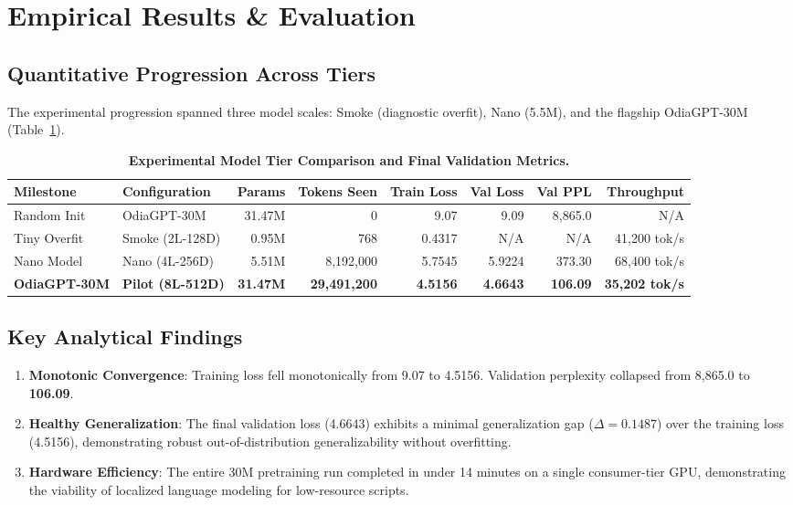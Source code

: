 \documentclass[10pt,twocolumn,letterpaper]{article}
\begin{document}
\section{Empirical Results \& Evaluation}

\subsection{Quantitative Progression Across Tiers}
The experimental progression spanned three model scales: Smoke (diagnostic overfit), Nano (5.5M), and the flagship OdiaGPT-30M (Table~\ref{tab:progression}).

\begin{table}[t]
\centering
\small
\caption{\textbf{Experimental Model Tier Comparison and Final Validation Metrics.}}
\label{tab:progression}
\begin{tabularx}{\textwidth}{llrrrrrr}
\toprule
\textbf{Milestone} & \textbf{Configuration} & \textbf{Params} & \textbf{Tokens Seen} & \textbf{Train Loss} & \textbf{Val Loss} & \textbf{Val PPL} & \textbf{Throughput} \\
\midrule
Random Init & OdiaGPT-30M & 31.47M & 0 & 9.07 & 9.09 & 8,865.0 & N/A \\
Tiny Overfit & Smoke (2L-128D) & 0.95M & 768 & 0.4317 & N/A & N/A & 41,200 tok/s \\
Nano Model & Nano (4L-256D) & 5.51M & 8,192,000 & 5.7545 & 5.9224 & 373.30 & 68,400 tok/s \\
\textbf{OdiaGPT-30M} & \textbf{Pilot (8L-512D)} & \textbf{31.47M} & \textbf{29,491,200} & \textbf{4.5156} & \textbf{4.6643} & \textbf{106.09} & \textbf{35,202 tok/s} \\
\bottomrule
\end{tabularx}
\end{table}

\subsection{Key Analytical Findings}
\begin{enumerate}
    \item \textbf{Monotonic Convergence}: Training loss fell monotonically from 9.07 to 4.5156. Validation perplexity collapsed from 8,865.0 to \textbf{106.09}.
    \item \textbf{Healthy Generalization}: The final validation loss (4.6643) exhibits a minimal generalization gap ($\Delta = 0.1487$) over the training loss (4.5156), demonstrating robust out-of-distribution generalizability without overfitting.
    \item \textbf{Hardware Efficiency}: The entire 30M pretraining run completed in under 14 minutes on a single consumer-tier GPU, demonstrating the viability of localized language modeling for low-resource scripts.
\end{enumerate}
\end{document}
